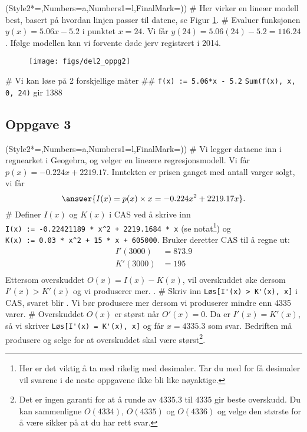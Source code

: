 \begin{easylist}[enumerate]
\ListProperties(Style2*=,Numbers=a,Numbers1=l,FinalMark={)})
# Her virker en lineær modell best, basert på hvordan linjen passer til datene, se Figur \ref{fig:del2_oppg2}.
# Evaluer funksjonen $y(x) = 5.06x - 5.2$ i punktet
$x = 24$. Vi får $y(24) = 5.06(24) - 5.2 = 116.24$.
Ifølge modellen kan vi forvente  døde jerv registrert i 2014.

\begin{figure}[ht!]
	\centering
	\texttt{[image: figs/del2\_oppg2]}
	\caption{}
	\label{fig:del2_oppg2}
\end{figure}


# Vi kan løse på 2 forskjellige måter
## \verb|f(x) := 5.06*x - 5.2| \verb|Sum(f(x), x, 0, 24)| gir 1388
\end{easylist}


\subsection*{Oppgave 3}
\begin{easylist}[enumerate]
	\ListProperties(Style2*=,Numbers=a,Numbers1=l,FinalMark={)})
	# Vi legger dataene inn i regnearket i Geogebra, og velger en lineære regresjonsmodell. Vi får $p(x) = -0.224x +2219.17$.
	Inntekten er prisen ganget med antall varger solgt, vi får
	\begin{equation*}
		\answer{I(x) = p(x) \times x = -0.224x^2 +2219.17x}.
	\end{equation*}
	# Definer $I(x)$ og $K(x)$ i CAS ved å skrive inn \\
	\verb|I(x) := -0.22421189 * x^2 + 2219.1684 * x| (se notat\footnote{Her er det viktig å ta med rikelig med desimaler. Tar du med for få desimaler vil svarene i de neste oppgavene ikke bli like nøyaktige.})
	og  \\
	\verb|K(x) := 0.03 * x^2 + 15 * x + 605000|.
	Bruker deretter CAS til å regne ut:
	\begin{align*}
		I'(3000) &= 873.9\\
		K'(3000) &= 195\\
	\end{align*}
	Ettersom overskuddet $O(x) = I(x)  - K(x)$, vil overskuddet øke
	dersom $I'(x) > K'(x)$ og vi produserer mer.
	.
	# Skriv inn \verb|Løs[I'(x) > K'(x), x]| i CAS, svaret blir
	.
	Vi bør produsere mer dersom vi produserer mindre enn 4335 varer.
	# Overskuddet $O(x)$ er størst når $O'(x) = 0$.
	Da er $I'(x) = K'(x)$, så vi skriver \verb|Løs[I'(x) = K'(x), x]|
	og får $x = 4335.3$ som svar. Bedriften må produsere og selge
	 for at overskuddet skal være størst\footnote{Det er ingen garanti for at å runde av $4335.3$ til $4335$ gir beste overskudd. Du kan sammenligne $O(4334)$, $O(4335)$ og $O(4336)$ og velge den største for å være sikker på at du har rett svar.}.
\end{easylist}

